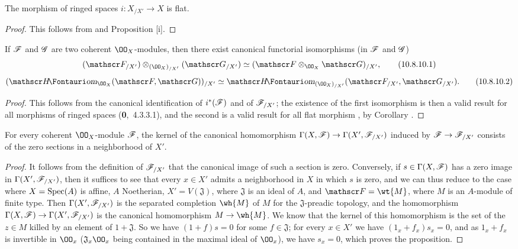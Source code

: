 \begin{cor}[10.8.9]
\label{1.10.8.9}
The morphism of ringed spaces $i:X_{/X'}\to X$ is flat.
\end{cor}

\begin{proof}
\label{proof-1.10.8.9}
This follows from  and Proposition [i].
\end{proof}

\begin{cor}[10.8.10]
\label{1.10.8.10}
If $\mathscr{F}$ and $\mathscr{G}$ are two coherent $\OO_X$-modules, then there exist canonical functorial isomorphisms (in $\mathscr{F}$ and $\mathscr{G}$)
\[
  (\sh{F}_{/X'})\otimes_{(\OO_X)_{/X'}}(\sh{G}_{/X'})\isoto(\sh{F}\otimes_{\OO_X}\sh{G})_{/X'},
  \tag{10.8.10.1}
\]
\[
  (\shHom_{\OO_X}(\sh{F},\sh{G}))_{/X'}\isoto\shHom_{(\OO_X)_{/X'}}(\sh{F}_{/X'},\sh{G}_{/X'}).
  \tag{10.8.10.2}
\]
\end{cor}

\begin{proof}
\label{proof-1.10.8.10}
This follows from the canonical identification of $i^*(\mathscr{F})$ and of $\mathscr{F}_{/X'}$; the existence of the first isomorphism is then a valid result for all morphisms of ringed spaces (\textbf{0},~4.3.3.1), and the second is a valid result for all flat morphism , by Corollary .
\end{proof}

\begin{prop}[10.8.11]
\label{1.10.8.11}
For every coherent $\OO_X$-module $\mathscr{F}$, the kernel of the canonical homomorphism $\Gamma(X,\sh{F})\to\Gamma(X',\sh{F}_{/X'})$ induced by $\sh{F}\to\sh{F}_{/X'}$ consists of the zero sections in a neighborhood of $X'$.
\end{prop}

\begin{proof}
\label{proof-1.10.8.11}
It follows from the definition of $\mathscr{F}_{/X'}$ that the canonical image of such a section is zero.
Conversely, if $s\in\Gamma(X,\mathscr{F})$ has a zero image in $\Gamma(X',\mathscr{F}_{/X'})$, then it suffices to see that every $x\in X'$ admits a neighborhood in $X$ in which $s$ is zero, and we can thus reduce to the case where $X=\operatorname{Spec}(A)$ is affine, $A$ Noetherian, $X'=V(\mathfrak{J})$, where $\mathfrak{J}$ is an ideal of $A$, and $\sh{F}=\wt{M}$, where $M$ is an $A$-module of finite type.
Then $\Gamma(X',\mathscr{F}_{/X'})$ is the separated completion $\wh{M}$ of $M$ for the $\mathfrak{J}$-preadic topology, and the homomorphism $\Gamma(X,\sh{F})\to\Gamma(X',\sh{F}_{/X'})$ is the canonical homomorphism $M\to\wh{M}$.
We know  that the kernel of this homomorphism is the set of the $z\in M$ killed by an element of $1+\mathfrak{J}$.
So we have $(1+f)s=0$ for some $f\in\mathfrak{J}$; for every $x\in X'$ we have $(1_x+f_x)s_x=0$, and as $1_x+f_x$ is invertible in $\OO_x$ ($\mathfrak{J}_x\OO_x$ being contained in the maximal ideal of $\OO_x$), we have $s_x=0$, which proves the proposition.
\end{proof}

